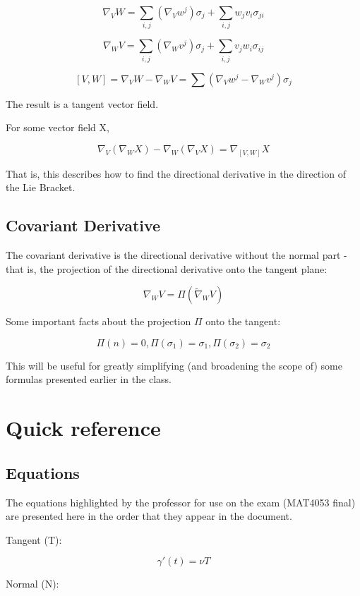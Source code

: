 \documentclass{article}
\begin{document}
\[ \nabla_{V} W = \sum_{i,j} (\nabla_{V} w^j)\sigma_{j} + \sum_{i,j} w_{j} v_{i} \sigma_{ji}\]

\[ \nabla_{W} V = \sum_{i,j} (\nabla_{W} v^j)\sigma_{j} + \sum_{i,j} v_{j} w_{i} \sigma_{ij}\]

\[ [V,W] = \nabla_{V} W - \nabla_{W} V = \sum (\nabla_{V} w^j - \nabla_{W} v^j)\sigma_{j} \]

The result is a tangent vector field.

For some vector field X,

\[ \nabla_{V} (\nabla_{W} X) - \nabla_{W} (\nabla_{V} X) = \nabla_{[V,W]} X \]

That is, this describes how to find the directional derivative in the direction of the Lie Bracket.

\subsection{Covariant Derivative}

The covariant derivative is the directional derivative without the normal part - that is, the projection of the directional derivative onto the tangent plane:

\[ \nabla_{W} V = \Pi(\widetilde{\nabla}_{W}V) \]

Some important facts about the projection $\Pi$ onto the tangent:

\[ \Pi(n) = 0, \Pi(\sigma_{1}) = \sigma_{1}, \Pi(\sigma_{2}) = \sigma_{2}\]

This will be useful for greatly simplifying (and broadening the scope of) some formulas presented earlier in the class.


 
 \section{Quick reference}
 
 \subsection{Equations}
 
 The equations highlighted by the professor for use on the exam (MAT4053 final) are presented here in the order that they appear in the document.
 
 Tangent (T):
 
 \[ \gamma'(t) = \nu T \]
 
 Normal (N):
 
\end{document}
